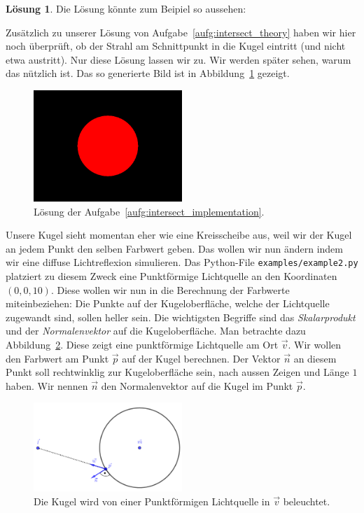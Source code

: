 \documentclass[12pt,a4paper]{article}
\theoremstyle{definition}
\theoremstyle{definition}
\newtheorem*{losung*}{Lösung}
\begin{document}
	\begin{losung*}
		Die Lösung könnte zum Beipiel so aussehen:
		
		Zusätzlich zu unserer Lösung von Aufgabe~\ref{aufg:intersect_theory} haben wir hier noch überprüft, ob der Strahl am Schnittpunkt in die Kugel eintritt (und nicht etwa austritt).
		Nur diese Lösung lassen wir zu.
		Wir werden später sehen, warum das nützlich ist.
		Das so generierte Bild ist in Abbildung~\ref{fig:solution_sphere} gezeigt.
		\begin{figure}[ht]
			\centering
			\includegraphics[width=0.5\textwidth]{images/example1.png}
			\caption{Lösung der Aufgabe~\ref{aufg:intersect_implementation}.}
			\label{fig:solution_sphere}
		\end{figure}
	\end{losung*}
	Unsere Kugel sieht momentan eher wie eine Kreisscheibe aus, weil wir der Kugel an jedem Punkt den selben Farbwert geben.
	Das wollen wir nun ändern indem wir eine diffuse Lichtreflexion simulieren.
	Das Python-File \texttt{examples/example2.py} platziert zu diesem Zweck eine Punktförmige Lichtquelle an den Koordinaten $(0,0,10)$.
	Diese wollen wir nun in die Berechnung der Farbwerte miteinbeziehen:
	Die Punkte auf der Kugeloberfläche, welche der Lichtquelle zugewandt sind, sollen heller sein.
	Die wichtigsten Begriffe sind das \textit{Skalarprodukt} und der \textit{Normalenvektor} auf die Kugeloberfläche.
	Man betrachte dazu Abbildung~\ref{fig:sphere_diffuse}.
	Diese zeigt eine punktförmige Lichtquelle am Ort $\vec{v}$.
	Wir wollen den Farbwert am Punkt $\vec{p}$ auf der Kugel berechnen. Der Vektor $\vec{n}$ an diesem Punkt soll rechtwinklig zur Kugeloberfläche sein, nach aussen Zeigen und Länge $1$ haben. Wir nennen $\vec{n}$ den Normalenvektor auf die Kugel im Punkt $\vec{p}$.
	\begin{figure}[ht]
		\centering
		\includegraphics[width=0.5\textwidth]{images/sphere_diffuse.pdf}
		\caption{Die Kugel wird von einer Punktförmigen Lichtquelle in $\vec{v}$ beleuchtet.}
	\label{fig:sphere_diffuse}
	\end{figure}
\end{document}
